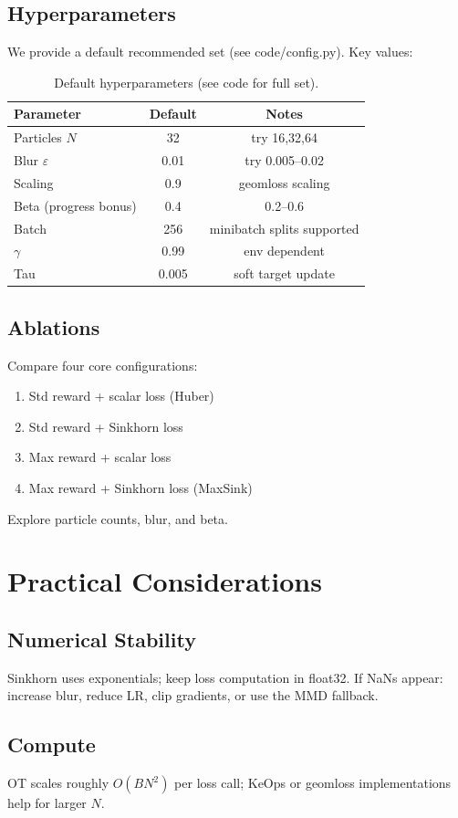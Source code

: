 \documentclass{article}
\begin{document}
\subsection{Hyperparameters}
We provide a default recommended set (see code/config.py). Key values:
\begin{table}[h!]
\centering
\begin{tabular}{lcc}
\toprule
Parameter & Default & Notes \\
\midrule
Particles $N$ & 32 & try 16,32,64\\
Blur $\varepsilon$ & 0.01 & try 0.005–0.02 \\
Scaling & 0.9 & geomloss scaling \\
Beta (progress bonus) & 0.4 & 0.2–0.6 \\
Batch & 256 & minibatch splits supported \\
$\gamma$ & 0.99 & env dependent \\
Tau & 0.005 & soft target update \\
\bottomrule
\end{tabular}
\caption{Default hyperparameters (see code for full set).}
\end{table}

\subsection{Ablations}
Compare four core configurations:
\begin{enumerate}
  \item Std reward + scalar loss (Huber)
  \item Std reward + Sinkhorn loss
  \item Max reward + scalar loss
  \item Max reward + Sinkhorn loss (MaxSink)
\end{enumerate}
Explore particle counts, blur, and beta.

\section{Practical Considerations}
\subsection{Numerical Stability}
Sinkhorn uses exponentials; keep loss computation in float32. If NaNs appear: increase blur, reduce LR, clip gradients, or use the MMD fallback.
\subsection{Compute}
OT scales roughly $O(BN^2)$ per loss call; KeOps or geomloss implementations help for larger $N$.
\end{document}
